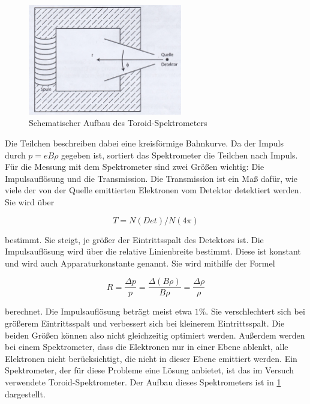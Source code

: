 \begin{figure}[h]
	\centering
	\includegraphics[width=0.6\textwidth]{Skizze.jpg}
	\caption{Schematischer Aufbau des Toroid-Spektrometers \cite[19]{anleitung-ws2014}}
	\label{fig:skizze}
\end{figure}

Die Teilchen beschreiben dabei eine kreisförmige Bahnkurve. Da der Impuls durch $p = eB\rho$ gegeben ist, sortiert das Spektrometer die Teilchen nach Impuls. Für die Messung mit dem Spektrometer sind zwei Größen wichtig: Die Impulsauflösung und die Transmission. Die Transmission ist ein Maß dafür, wie viele der von der Quelle emittierten Elektronen vom Detektor detektiert werden. Sie wird über

\begin{equation}
T = N(Det)/N(4\pi)
\label{eq:transmission}
\end{equation}

bestimmt. Sie steigt, je größer der Eintrittsspalt des Detektors ist. Die Impulsauflösung wird über die relative Linienbreite bestimmt. Diese ist konstant und wird auch Apparaturkonstante genannt. Sie wird mithilfe der Formel

\begin{equation}
R = \frac{\Delta p}{p} = \frac{\Delta(B\rho)}{B\rho} = \frac{\Delta\rho}{\rho}
\label{eq:apparaturkonstante}
\end{equation}

berechnet. Die Impulsauflösung beträgt meist etwa $1\%$. Sie verschlechtert sich bei größerem Eintrittsspalt und verbessert sich bei kleinerem Eintrittsspalt. Die beiden Größen können also nicht gleichzeitig optimiert werden. Außerdem werden bei einem Spektrometer, dass die Elektronen nur in einer Ebene ablenkt, alle Elektronen nicht berücksichtigt, die nicht in dieser Ebene emittiert werden. Ein Spektrometer, der für diese Probleme eine Lösung anbietet, ist das im Versuch verwendete Toroid-Spektrometer. Der Aufbau dieses Spektrometers ist in \cref{fig:skizze} dargestellt.


